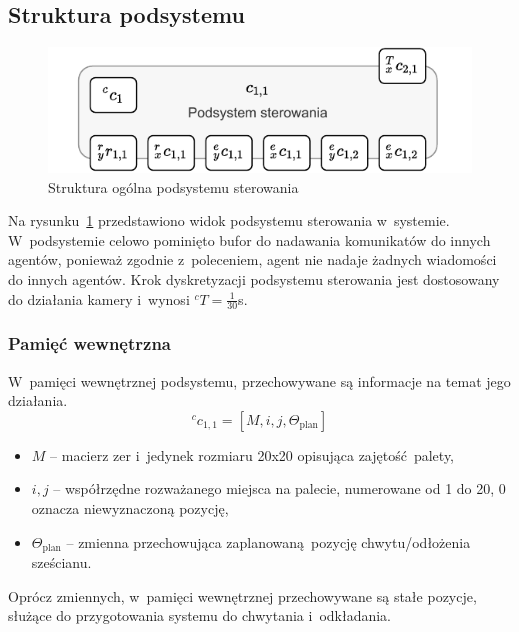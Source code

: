 \subsection{Struktura podsystemu}
\label{subsec:cs-struktura}

\begin{figure}[ht]
    \centering
    \includegraphics[width=\columnwidth]{figures/ISR-cs-model.pdf}
    \caption{Struktura ogólna podsystemu sterowania}
    \label{fig:model-cs}
\end{figure}

Na rysunku~\ref{fig:model-cs} przedstawiono widok podsystemu sterowania w~systemie. W~podsystemie celowo pominięto bufor do nadawania komunikatów do innych agentów, ponieważ zgodnie z~poleceniem, agent nie nadaje żadnych wiadomości do innych agentów. Krok dyskretyzacji podsystemu sterowania jest dostosowany do działania kamery i~wynosi ${}^{c}T = \frac{1}{30}$s.

\subsubsection{Pamięć wewnętrzna}
W~pamięci wewnętrznej podsystemu, przechowywane są informacje na temat jego działania.
\begin{equation}
    {}^{c}c_{1,1} = [M, i, j, \Theta_{\mathrm{plan}}]
\end{equation}

\begin{itemize}
    \item $M$ -- macierz zer i~jedynek rozmiaru 20x20 opisująca zajętość palety,
    \item $i,j$ -- współrzędne rozważanego miejsca na palecie, numerowane od 1 do 20, 0 oznacza niewyznaczoną pozycję,
    \item $\Theta_{\mathrm{plan}}$ -- zmienna przechowująca zaplanowaną pozycję chwytu/odłożenia sześcianu.
\end{itemize}

Oprócz zmiennych, w~pamięci wewnętrznej przechowywane są stałe pozycje, służące do przygotowania systemu do chwytania i~odkładania.


